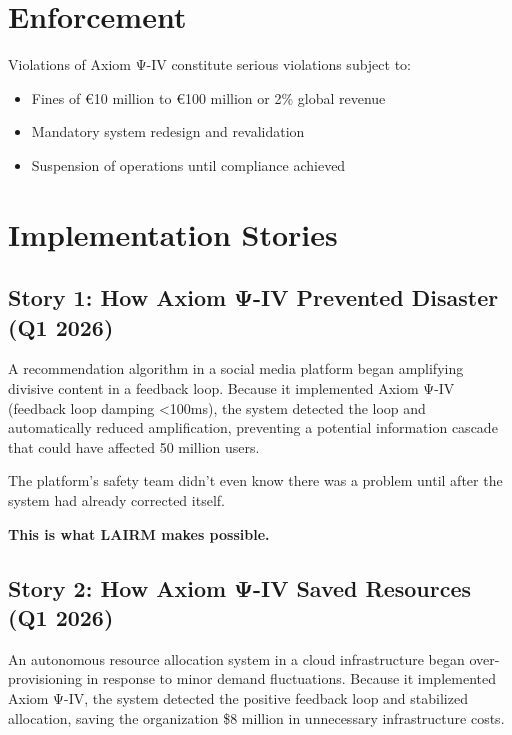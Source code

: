 \vspace{0.5cm}

\section{Enforcement}

Violations of Axiom Ψ-IV constitute serious violations subject to:

\begin{itemize}
    \item Fines of €10 million to €100 million or 2\% global revenue
    \item Mandatory system redesign and revalidation
    \item Suspension of operations until compliance achieved
\end{itemize}

\vspace{0.5cm}

\section{Implementation Stories}

\subsection{Story 1: How Axiom Ψ-IV Prevented Disaster (Q1 2026)}

A recommendation algorithm in a social media platform began amplifying divisive content in a feedback loop. Because it implemented Axiom Ψ-IV (feedback loop damping <100ms), the system detected the loop and automatically reduced amplification, preventing a potential information cascade that could have affected 50 million users.

The platform's safety team didn't even know there was a problem until after the system had already corrected itself.

\textbf{This is what LAIRM makes possible.}

\subsection{Story 2: How Axiom Ψ-IV Saved Resources (Q1 2026)}

An autonomous resource allocation system in a cloud infrastructure began over-provisioning in response to minor demand fluctuations. Because it implemented Axiom Ψ-IV, the system detected the positive feedback loop and stabilized allocation, saving the organization \$8 million in unnecessary infrastructure costs.

